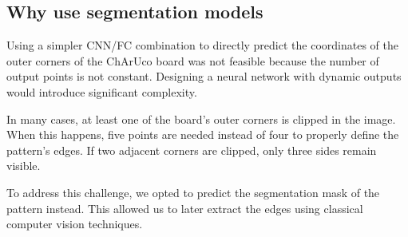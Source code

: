\subsection{Why use segmentation models}


Using a simpler CNN/FC combination to directly predict the coordinates of the outer corners of the
ChArUco board was not feasible because the number of output points is not constant. Designing a
neural network with dynamic outputs would introduce significant complexity.  

In many cases, at least one of the board’s outer corners is clipped in the image. When this
happens, five points are needed instead of four to properly define the pattern’s edges. If two
adjacent corners are clipped, only three sides remain visible.  

To address this challenge, we opted to predict the segmentation mask of the pattern instead. This
allowed us to later extract the edges using classical computer vision techniques.
